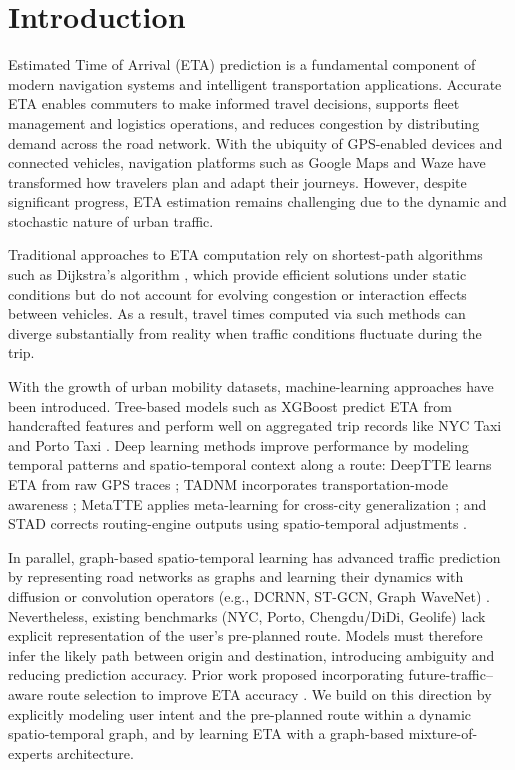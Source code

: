 \section{Introduction}
Estimated Time of Arrival (ETA) prediction is a fundamental component of modern navigation systems and intelligent transportation applications. Accurate ETA enables commuters to make informed travel decisions, supports fleet management and logistics operations, and reduces congestion by distributing demand across the road network. With the ubiquity of GPS-enabled devices and connected vehicles, navigation platforms such as Google Maps and Waze \cite{derrowpinion2021googlemaps,hoseinzadeh2020waze,amin-naseri2018waze} have transformed how travelers plan and adapt their journeys. However, despite significant progress, ETA estimation remains challenging due to the dynamic and stochastic nature of urban traffic.

Traditional approaches to ETA computation rely on shortest-path algorithms such as Dijkstra's algorithm \cite{dijkstra1959}, which provide efficient solutions under static conditions but do not account for evolving congestion or interaction effects between vehicles. As a result, travel times computed via such methods can diverge substantially from reality when traffic conditions fluctuate during the trip.

With the growth of urban mobility datasets, machine-learning approaches have been introduced. Tree-based models such as XGBoost \cite{chen2016xgboost} predict ETA from handcrafted features and perform well on aggregated trip records like NYC Taxi and Porto Taxi \cite{nyc_tlc,moreira2013porto}. Deep learning methods improve performance by modeling temporal patterns and spatio-temporal context along a route: DeepTTE learns ETA from raw GPS traces \cite{wang2018deeptte}; TADNM incorporates transportation-mode awareness \cite{xu2020tadnm}; MetaTTE applies meta-learning for cross-city generalization \cite{wang2022metatte}; and STAD corrects routing-engine outputs using spatio-temporal adjustments \cite{abbar2020stad}.

In parallel, graph-based spatio-temporal learning has advanced traffic prediction by representing road networks as graphs and learning their dynamics with diffusion or convolution operators (e.g., DCRNN, ST-GCN, Graph WaveNet) \cite{li2018dcrnn,yu2018stgcn,wu2019graphwavenet}. Nevertheless, existing benchmarks (NYC, Porto, Chengdu/DiDi, Geolife) \cite{nyc_tlc,moreira2013porto,didi2016,zheng2012geolife} lack explicit representation of the user's pre-planned route. Models must therefore infer the likely path between origin and destination, introducing ambiguity and reducing prediction accuracy. Prior work proposed incorporating future-traffic–aware route selection to improve ETA accuracy \cite{voloch2021}. We build on this direction by explicitly modeling user intent and the pre-planned route within a dynamic spatio-temporal graph, and by learning ETA with a graph-based mixture-of-experts architecture.

